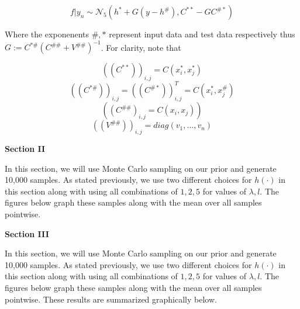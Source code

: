 \documentclass[12pt,leqno]{article}
\begin{document}
	\[ f | y_n \sim \mathcal{N}_5 \left( h^{*} +G(y-h^\#), C^{**} - GC^{\#*}\right)\]
	
	Where the exponenents $\#, *$ represent input data and test data respectively thus $G:=C^{*\#}(C^{\#\#}+V^{\#\#})^{-1}$. For clarity, note that
	
	\[ ((C^{**}))_{i,j} = C(x^*_i, x^*_j)\]
	\[ ((C^{*\#}))_{i,j} =((C^{\#*}))_{i,j}^T=C(x^*_i, x^\#_j)\]
	\[((C^{\#\#})_{i,j}=C(x_i,x_j))\]
	\[((V^{\#\#}))_{i,j}=diag(v_1,...,v_n)\]
	
	\newpage
		
	\textbf{Section II}
	
	In this section, we will use Monte Carlo sampling on our prior and generate 10,000 samples. As stated previously, we use two different choices for $h(\cdot)$ in this section along with using all combinations of ${1,2,5}$ for values of $\lambda,l$. The figures below graph these samples along with the mean over all samples pointwise.
	
	\textbf{Section III}
	
	In this section, we will use Monte Carlo sampling on our prior and generate 10,000 samples. As stated previously, we use two different choices for $h(\cdot)$ in this section along with using all combinations of ${1,2,5}$ for values of $\lambda,l$. The figures below graph these samples along with the mean over all samples pointwise. These results are summarized graphically below.
	
	\begin{figure}[htp]
		\label{fig:h0ll1}
		\caption{}
		
		
	\end{figure}

	
	
\end{document}
